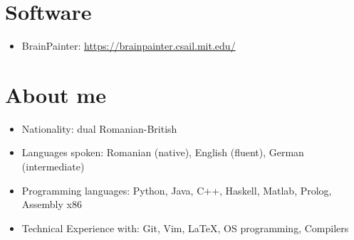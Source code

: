 \documentclass[a4paper,10pt]{article} %
\begin{document}
\section*{Software}
\begin{itemize}
 \item BrainPainter: \url{https://brainpainter.csail.mit.edu/}
\end{itemize}

\section*{About me}
\begin{itemize}
 \item Nationality: dual Romanian-British
 \item Languages spoken: Romanian (native), English (fluent), German (intermediate)
 \item Programming languages: Python, Java, C++, Haskell, Matlab, Prolog, Assembly x86
 \item Technical Experience with: Git, Vim, \LaTeX, OS programming, Compilers
\end{itemize}




\end{document}
